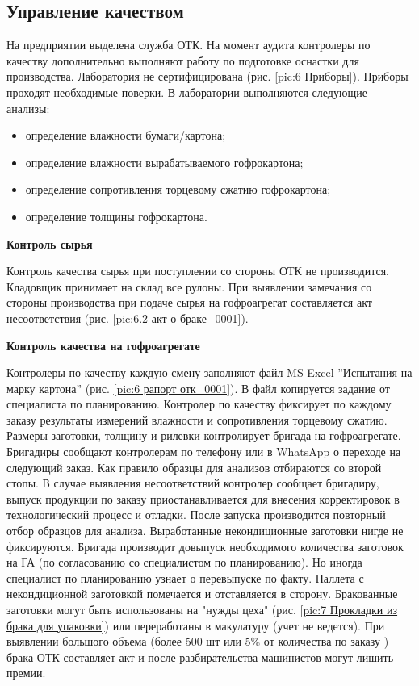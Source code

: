 \subsection{Управление качеством}
\label{bp:quality}

На предприятии выделена служба ОТК. На момент аудита контролеры по качеству дополнительно выполняют работу по подготовке оснастки для производства. Лаборатория не сертифицирована (рис. \ref{pic:6 Приборы}). Приборы проходят необходимые поверки. В лаборатории выполняются следующие анализы:

\begin{itemize}
    \item определение влажности бумаги/картона;
    \item определение влажности вырабатываемого гофрокартона; 
    \item определение сопротивления торцевому сжатию гофрокартона;
    \item определение толщины гофрокартона.
\end{itemize}

\textbf{Контроль сырья}

Контроль качества сырья при поступлении со стороны ОТК не производится. Кладовщик принимает на склад все рулоны. При выявлении замечания со стороны производства при подаче сырья на гофроагрегат составляется акт несоответствия (рис. \ref{pic:6.2 акт о браке_0001}).

\textbf{Контроль качества на гофроагрегате}

Контролеры по качеству каждую смену заполняют файл MS Excel ''Испытания на марку картона'' (рис. \ref{pic:6 рапорт отк_0001}). В файл копируется задание от специалиста по планированию. Контролер по качеству фиксирует по каждому заказу результаты измерений влажности и сопротивления торцевому сжатию. Размеры заготовки, толщину и рилевки контролирует бригада на гофроагрегате. Бригадиры сообщают контролерам по телефону или в WhatsApp о переходе на следующий заказ. Как правило образцы для анализов отбираются со второй стопы. В случае выявления несоответствий контролер сообщает бригадиру, выпуск продукции по заказу приостанавливается для внесения корректировок в технологический процесс и отладки. После запуска производится повторный отбор образцов для анализа. Выработанные некондиционные заготовки нигде не фиксируются. Бригада производит довыпуск необходимого количества заготовок на ГА (по согласованию со специалистом по планированию). Но иногда специалист по планированию узнает о перевыпуске по факту. Паллета  с некондиционной заготовкой помечается и отставляется в сторону. Бракованные заготовки  могут быть использованы на "нужды цеха" (рис. \ref{pic:7 Прокладки из брака для упаковки}) или переработаны в макулатуру (учет не ведется). При выявлении большого объема (более 500 шт или 5\% от количества по заказу ) брака ОТК составляет акт  и после разбирательства машинистов могут лишить премии.

